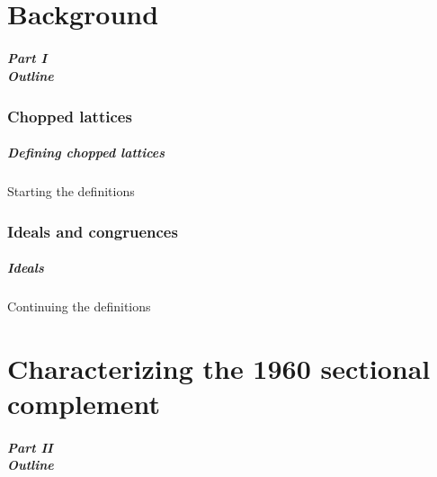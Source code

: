 \documentclass{beamer}
\begin{document}


\part{Background}

\begin{frame}
\partpage
\end{frame}

\begin{frame}
\frametitle{Part I\\Outline}

\tableofcontents
\end{frame}

\section{Chopped lattices}

\begin{frame}
\frametitle{Defining chopped lattices}

Starting the definitions
\end{frame}

\section{Ideals and congruences}

\begin{frame}
\frametitle{Ideals}

Continuing the definitions
\end{frame}

\part{Characterizing the 1960 sectional complement}

\begin{frame}
\partpage
\end{frame}

\begin{frame}
\frametitle{Part II\\Outline}

\tableofcontents
\end{frame}
\end{document}
